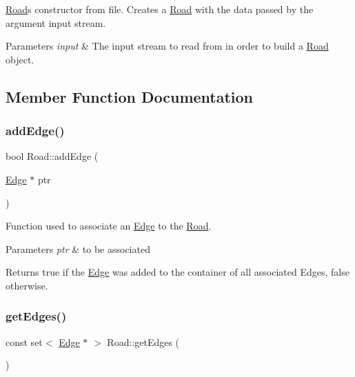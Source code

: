 \hyperlink{class_road}{Road}\textquotesingle{}s constructor from file. Creates a \hyperlink{class_road}{Road} with the data passed by the argument input stream.


\begin{DoxyParams}{Parameters}
{\em input} & The input stream to read from in order to build a \hyperlink{class_road}{Road} object. \\
\hline
\end{DoxyParams}


\subsection{Member Function Documentation}
\hypertarget{class_road_a7a691f98e8bd53299ed2539de1e4d13c}{}\label{class_road_a7a691f98e8bd53299ed2539de1e4d13c} 
\subsubsection{\texorpdfstring{add\+Edge()}{addEdge()}}
{\footnotesize\ttfamily bool Road\+::add\+Edge (\begin{DoxyParamCaption}\item[{\hyperlink{class_edge}{Edge} $\ast$}]{ptr }\end{DoxyParamCaption})}

Function used to associate an \hyperlink{class_edge}{Edge} to the \hyperlink{class_road}{Road}.


\begin{DoxyParams}{Parameters}
{\em ptr} & to be associated\\
\hline
\end{DoxyParams}
\begin{DoxyReturn}{Returns}
true if the \hyperlink{class_edge}{Edge} was added to the container of all associated Edges, false otherwise. 
\end{DoxyReturn}
\hypertarget{class_road_a03fb1c0a74b860e4be6c951154add098}{}\label{class_road_a03fb1c0a74b860e4be6c951154add098} 
\subsubsection{\texorpdfstring{get\+Edges()}{getEdges()}}
{\footnotesize\ttfamily const set$<$ \hyperlink{class_edge}{Edge} $\ast$ $>$ Road\+::get\+Edges (\begin{DoxyParamCaption}{ }\end{DoxyParamCaption})}

